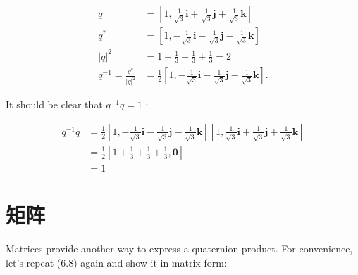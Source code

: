 $$
    \begin{aligned}
        q                            & =\left[1, \frac{1}{\sqrt{3}} \mathbf{i}+\frac{1}{\sqrt{3}} \mathbf{j}+\frac{1}{\sqrt{3}} \mathbf{k}\right]              \\
        q^{*}                        & =\left[1,-\frac{1}{\sqrt{3}} \mathbf{i}-\frac{1}{\sqrt{3}} \mathbf{j}-\frac{1}{\sqrt{3}} \mathbf{k}\right]              \\
        |q|^{2}                      & =1+\frac{1}{3}+\frac{1}{3}+\frac{1}{3}=2                                                                                \\
        q^{-1}=\frac{q^{*}}{|q|^{2}} & =\frac{1}{2}\left[1,-\frac{1}{\sqrt{3}} \mathbf{i}-\frac{1}{\sqrt{3}} \mathbf{j}-\frac{1}{\sqrt{3}} \mathbf{k}\right] .
    \end{aligned}
$$

It should be clear that $q^{-1} q=1$ :

$$
    \begin{aligned}
        q^{-1} q & =\frac{1}{2}\left[1,-\frac{1}{\sqrt{3}} \mathbf{i}-\frac{1}{\sqrt{3}} \mathbf{j}-\frac{1}{\sqrt{3}} \mathbf{k}\right]\left[1, \frac{1}{\sqrt{3}} \mathbf{i}+\frac{1}{\sqrt{3}} \mathbf{j}+\frac{1}{\sqrt{3}} \mathbf{k}\right] \\
                 & =\frac{1}{2}\left[1+\frac{1}{3}+\frac{1}{3}+\frac{1}{3}, \mathbf{0}\right]                                                                                                                                                     \\
                 & =1
    \end{aligned}
$$

\section{矩阵}
Matrices provide another way to express a quaternion product. For convenience, let's repeat (6.8) again and show it in matrix form:

